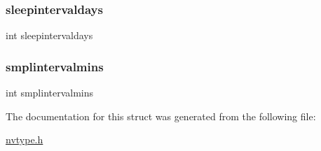 \mbox{\label{structnvstruct_afd55ea1fa18fbe9ef04251bbf4948e7b}} 
\subsubsection{\texorpdfstring{sleepintervaldays}{sleepintervaldays}}
{\footnotesize\ttfamily int sleepintervaldays}

\mbox{\label{structnvstruct_a4447bd6767bd8a45338bdeeae4cb0511}} 
\subsubsection{\texorpdfstring{smplintervalmins}{smplintervalmins}}
{\footnotesize\ttfamily int smplintervalmins}



The documentation for this struct was generated from the following file\+:\begin{DoxyCompactItemize}
\item 
\mbox{\hyperlink{nvtype_8h}{nvtype.\+h}}\end{DoxyCompactItemize}
